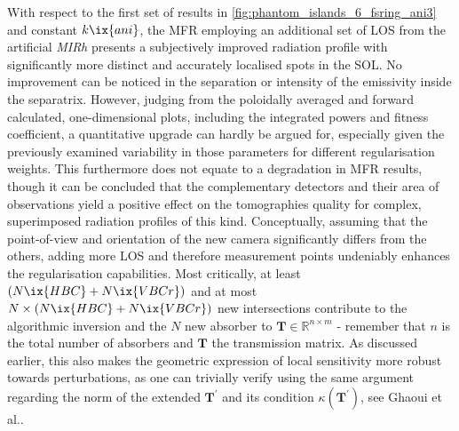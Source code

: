                 With respect to the first set of results in \cref{fig:phantom_islands_6_fsring_ani3} and constant $k\ix{ani}$, the MFR employing an additional set of LOS from the artificial \textit{MIRh} presents a subjectively improved radiation profile with significantly more distinct and accurately localised spots in the SOL. No improvement can be noticed in the separation or intensity of the emissivity inside the separatrix. However, judging from the poloidally averaged and forward calculated, one-dimensional plots, including the integrated powers and fitness coefficient, a quantitative upgrade can hardly be argued for, especially given the previously examined variability in those parameters for different regularisation weights. This furthermore does not equate to a degradation in MFR results, though it can be concluded that the complementary detectors and their area of observations yield a positive effect on the tomographies quality for complex, superimposed radiation profiles of this kind. Conceptually, assuming that the point-of-view and orientation of the new camera significantly differs from the others, adding more LOS and therefore measurement points undeniably enhances the regularisation capabilities. Most critically, at least $\left(N\ix{HBC}+N\ix{VBCr}\right)$ and at most $N\times\left(N\ix{HBC}+N\ix{VBCr}\right)$ new intersections contribute to the algorithmic inversion and the $N$ new absorber to $\mathbf{T}\in\mathbb{R}^{n\times m}$ - remember that $n$ is the total number of absorbers and $\mathbf{T}$ the transmission matrix. As discussed earlier, this also makes the geometric expression of local sensitivity more robust towards perturbations, as one can trivially verify using the same argument regarding the norm of the extended $\mathbf{T}^{\prime}$ and its condition $\kappa\left(\mathbf{T}^{\prime}\right)$, see Ghaoui et al.\cite{Ghaoui2002}.%
%

